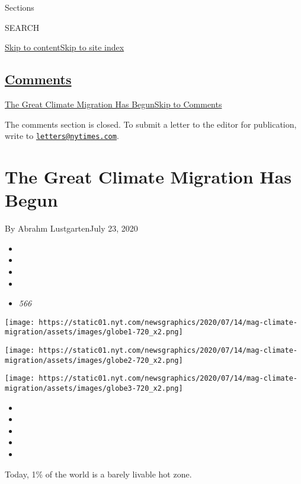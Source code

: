 Sections

SEARCH

\protect\hyperlink{site-content}{Skip to
content}\protect\hyperlink{site-index}{Skip to site index}

\hypertarget{comments}{%
\subsection{\texorpdfstring{\protect\hyperlink{commentsContainer}{Comments}}{Comments}}\label{comments}}

\href{}{The Great Climate Migration Has Begun}\href{}{Skip to Comments}

The comments section is closed. To submit a letter to the editor for
publication, write to
\href{mailto:letters@nytimes.com}{\nolinkurl{letters@nytimes.com}}.

\hypertarget{the-great-climate-migration-has-begun}{%
\section{The Great Climate Migration Has
Begun}\label{the-great-climate-migration-has-begun}}

By Abrahm LustgartenJuly 23, 2020

\begin{itemize}
\item
\item
\item
\item
\item
  \emph{566}
\end{itemize}

\texttt{[image: https://static01.nyt.com/newsgraphics/2020/07/14/mag-climate-migration/assets/images/globe1-720\_x2.png]}

\texttt{[image: https://static01.nyt.com/newsgraphics/2020/07/14/mag-climate-migration/assets/images/globe2-720\_x2.png]}

\texttt{[image: https://static01.nyt.com/newsgraphics/2020/07/14/mag-climate-migration/assets/images/globe3-720\_x2.png]}

\begin{itemize}
\item
\item
\item
\item
\item
\end{itemize}

Today, 1\% of the world is a barely livable hot zone.

